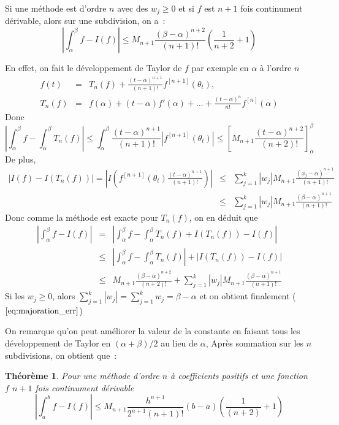 \documentclass[a4paper,11pt]{article}
\newtheorem{thm}{Théorème}
\begin{document}
\begin{giacjshere}
Si une méthode est d'ordre $n$ avec des $w_j\geq 0$ et 
si $f$ est $n+1$ fois continument dérivable,
alors sur une subdivision, on a~:
\begin{equation} \label{eq:majoration_err}
|\int_{\alpha}^{\beta} f-I(f)| \leq M_{n+1} \frac{(\beta-\alpha)^{n+2}}{(n+1)!}
(\frac{1}{n+2}+1)
\end{equation}

En effet, on fait le développement de Taylor de $f$ par exemple
en $\alpha$ à l'ordre $n$
\begin{eqnarray*}
 f(t)&=&T_{n}(f)+\frac{(t-\alpha)^{n+1}}{(n+1)!} f^{[n+1]}(\theta_t),\\
 T_{n}(f)&=&f(\alpha)+(t-\alpha)f'(\alpha)+...+ 
\frac{(t-\alpha)^{n}}{n!} f^{[n]}(\alpha)
\end{eqnarray*}
Donc 
\[ |\int_{\alpha}^{\beta} f- \int_{\alpha}^{\beta} T_{n}(f)|
\leq \int_{\alpha}^{\beta} \frac{(t-\alpha)^{n+1}}{(n+1)!} |f^{[n+1]}(\theta_t)| 
\leq \left[ M_{n+1} \frac{(t-\alpha)^{n+2}}{(n+2)!} \right]_\alpha^\beta
\]
De plus, 
\begin{eqnarray*}
 |I(f) -I(T_n(f))| =|I\left( f^{[n+1]}(\theta_t)
  \frac{(t-\alpha)^{n+1}}{(n+1)!} \right)|
& \leq &  \sum_{j=1}^k |w_j| M_{n+1} \frac{(x_j-\alpha)^{n+1}}{(n+1)!} 
\\
& \leq & \sum_{j=1}^k |w_j| M_{n+1} \frac{(\beta-\alpha)^{n+1}}{(n+1)!}
\end{eqnarray*}
Donc comme la méthode est exacte pour $T_n(f)$, on en déduit que
\begin{eqnarray*}
|\int_{\alpha}^{\beta} f-I(f)|
&= &|\int_{\alpha}^{\beta} f-\int_{\alpha}^{\beta} T_n(f)+I(T_n(f))- I(f)| \\
&\leq& |\int_{\alpha}^{\beta} f-\int_{\alpha}^{\beta} T_n(f)|+|I(T_n(f))- I(f)|\\
&\leq & M_{n+1}  \frac{(\beta-\alpha)^{n+2}}{(n+2)!} +  
\sum_{j=1}^k |w_j| M_{n+1} \frac{(\beta-\alpha)^{n+1}}{(n+1)!} 
\end{eqnarray*}
Si les $w_j\geq 0$, alors $\sum_{j=1}^k |w_j|=\sum_{j=1}^k w_j=\beta-\alpha$
et on obtient finalement (\(\ref{eq:majoration_err}\))

On remarque qu'on peut am\'eliorer la valeur de la constante 
en faisant tous les d\'eveloppement de Taylor
en $(\alpha+\beta)/2$ au lieu de $\alpha$, 
Après sommation sur les $n$ subdivisions, on obtient que~:
\begin{thm}
Pour une méthode d'ordre $n$ à coefficients positifs et une fonction $f$
$n+1$ fois continument d\'erivable~
\[|\int_{a}^{b} f-I(f)| \leq M_{n+1} \frac{h^{n+1}}{2^{n+1}(n+1)!}  (b-a) 
(\frac{1}{(n+2)}+1)\]
\end{thm}


\end{giacjshere}
\end{document}
